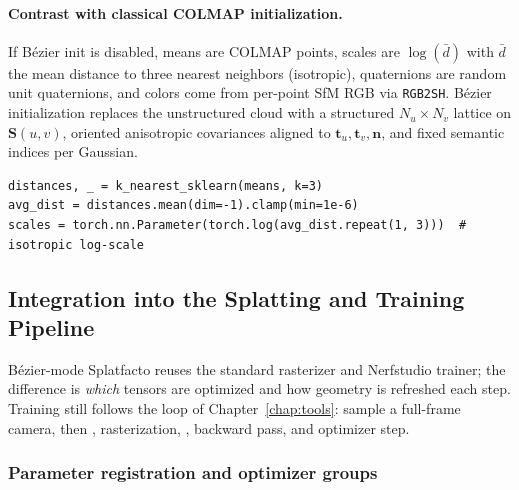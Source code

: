 \paragraph{Contrast with classical COLMAP initialization.}
If B\'ezier init is disabled, means are COLMAP points, scales are $\log(\bar{d})$ with $\bar{d}$ the mean distance to three nearest neighbors (isotropic), quaternions are random unit quaternions, and colors come from per-point SfM RGB via \texttt{RGB2SH}. B\'ezier initialization replaces the unstructured cloud with a structured $N_u\times N_v$ lattice on $\mathbf{S}(u,v)$, oriented anisotropic covariances aligned to $\mathbf{t}_u,\mathbf{t}_v,\mathbf{n}$, and fixed semantic indices per Gaussian.

\begin{lstlisting}[caption={Classical COLMAP scale init (fallback path, \filepath{splatfacto.py}).},label={lst:classic_scale}]
distances, _ = k_nearest_sklearn(means, k=3)
avg_dist = distances.mean(dim=-1).clamp(min=1e-6)
scales = torch.nn.Parameter(torch.log(avg_dist.repeat(1, 3)))  # isotropic log-scale
\end{lstlisting}

\subsection{Integration into the Splatting and Training Pipeline}
\label{subsec:bezier_pipeline}

B\'ezier-mode Splatfacto reuses the standard  rasterizer and Nerfstudio trainer; the difference is \emph{which} tensors are optimized and how geometry is refreshed each step. Training still follows the loop of Chapter~\ref{chap:tools}: sample a full-frame camera, then , rasterization, , backward pass, and optimizer step.

\subsubsection{Parameter registration and optimizer groups}
\label{subsubsec:bezier_optimizer}

